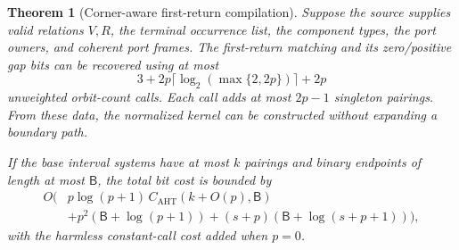 \documentclass[11pt]{article}
\newtheorem{theorem}{Theorem}[section]
\theoremstyle{definition}
\theoremstyle{remark}\newtheorem{remark}[theorem]{Remark}
\newcommand{\bits}{\mathsf B}
\newcommand{\AHT}{C_{\mathrm{AHT}}}
\begin{document}
\begin{theorem}[Corner-aware first-return compilation]\label{thm:compile}
Suppose the source supplies valid relations $V,R$, the terminal occurrence list, the component types, the port owners, and coherent port frames. The first-return matching and its zero/positive gap bits can be recovered using at most
\begin{equation}\label{eq:queries}
  3+2p\lceil\log_2(\max\{2,2p\})\rceil+2p
\end{equation}
unweighted orbit-count calls. Each call adds at most $2p-1$ singleton pairings. From these data, the normalized kernel can be constructed without expanding a boundary path.

If the base interval systems have at most $k$ pairings and binary endpoints of length at most $\bits$, the total bit cost is bounded by
\begin{equation}\label{eq:compiler-cost}
\begin{split}
 O\big(&p\log(p+1)\,\AHT(k+O(p),\bits)\\
       &+p^2(\bits+\log(p+1))
        +(s+p)(\bits+\log(s+p+1))\big),
\end{split}
\end{equation}
with the harmless constant-call cost added when $p=0$.
\end{theorem}
\end{document}
